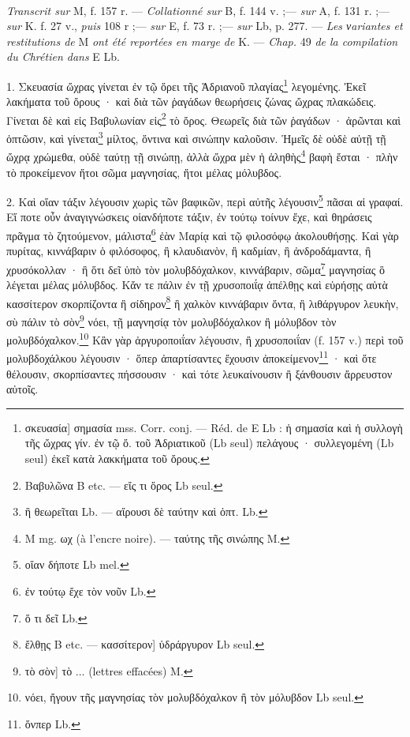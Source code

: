 \documentclass[landscape, a4paper, 11pt, oneside, polutonikogreek, french]{article}
\begin{document}
\paragraph{}
\emph{Transcrit sur} M, f. 157 r. --- \emph{Collationné sur} B, f. 144 v. ;--- \emph{sur} A, f. 131 r. ;--- \emph{sur} K. f. 27 v., \emph{puis} 108 r ;--- \emph{sur} E, f. 73 r. ;--- \emph{sur} Lb, p. 277. --- \emph{Les νariantes et restitutions de} M \emph{ont été reportées en marge de} K. --- \emph{Chap.} 49 \emph{de la compilation du Chrétien dans} E Lb.

\bigskip

1. Σκευασία ὤχρας γίνεται ἐν τῷ ὄρει τῆς Ἁδριανοῦ πλαγίας\footnote{σκευασία] σημασία mss. Corr. conj. --- Réd. de E Lb : ἡ σημασία καὶ ἡ συλλογὴ τῆς ὤχρας γίν. ἐν τῷ ὄ. τοῦ Ἀδριατικοῦ (Lb seul) πελάγους · συλλεγομένη (Lb seul) ἐκεῖ κατὰ λακκήματα τοῦ ὄρους.} λεγομένης. Ἐκεῖ λακήματα τοῦ ὄρους · καὶ διὰ τῶν ῥαγάδων θεωρήσεις ζώνας ὤχρας πλακώδεις. Γίνεται δὲ καὶ εἰς Βαβυλωνίαν εἰς\footnote{Bαβυλῶνα B etc. --- εἴς τι ὄρος Lb seul.} τὸ ὄρος. Θεωρεῖς διὰ τῶν ῥαγάδων · ἀρῶνται καὶ ὀπτῶσιν, καὶ γίνεται\footnote{ἣ θεωρεῖται Lb. --- αἴρουσι δὲ ταύτην καὶ ὀπτ. Lb.} μίλτος, ὅντινα καὶ σινώπην καλοῦσιν. Ἡμεῖς δὲ οὐδὲ αὐτῇ τῇ ὤχρᾳ χρώμεθα, οὐδὲ ταύτῃ τῇ σινώπῃ, ἀλλὰ ὤχρα μὲν ἡ ἀληθὴς\footnote{M mg. ωχ (à l'encre noire). --- ταύτης τῆς σινώπης M.} βαφὴ ἔσται · πλὴν τὸ προκείμενον ἤτοι σῶμα μαγνησίας, ἤτοι μέλας μόλυβδος.

2. Καὶ οἵαν τάξιν λέγουσιν χωρὶς τῶν βαφικῶν, περὶ αὐτῆς λέγουσιν\footnote{οἵαν δήποτε Lb mel.} πᾶσαι αἱ γραφαί. Εἴ ποτε οὖν ἀναγιγνώσκεις οἱανδήποτε τάξιν, ἐν τούτῳ τοίνυν ἔχε, καὶ θηράσεις πρᾶγμα τὸ ζητούμενον, μάλιστα\footnote{ἐν τούτῳ ἔχε τὸν νοῦν Lb.} ἐὰν Μαρίᾳ καὶ τῷ φιλοσόφῳ ἀκολουθήσῃς. Καὶ γὰρ πυρίτας, κιννάβαριν ὁ φιλόσοφος, ἢ κλαυδιανὸν, ἢ καδμίαν, ἢ ἀνδροδάμαντα, ἢ χρυσόκολλαν · ἢ ὅτι δεῖ ὑπὸ τὸν μολυβδόχαλκον, κιννάβαριν, σῶμα\footnote{ὅ τι δεῖ Lb.} μαγνησίας ὃ λέγεται μέλας μόλυβδος. Κἄν τε πάλιν ἐν τῇ χρυσοποιΐᾳ ἀπέλθῃς καὶ εὑρήσῃς αὐτὰ κασσίτερον σκορπίζοντα ἢ σίδηρον\footnote{ἔλθῃς B etc. --- κασσίτερον] ὑδράργυρον Lb seul.} ἢ χαλκὸν κιννάβαριν ὄντα, ἢ λιθάργυρον λευκὴν, σὺ πάλιν τὸ σὸν\footnote{τὸ σὸν] τὸ ... (lettres effacées) M.} νόει, τῇ μαγνησίᾳ τὸν μολυβδόχαλκον ἢ μόλυβδον τὸν μολυβδόχαλκον.\footnote{νόει, ἤγουν τῆς μαγνησίας τὸν μολυβδόχαλκον ἢ τὸν μόλυβδον Lb seul.} Κἂν γὰρ ἀργυροποιΐαν λέγουσιν, ἢ χρυσοποιΐαν (f. 157 v.) περὶ τοῦ μολυβδοχάλκου λέγουσιν · ὅπερ ἀπαρτίσαντες ἔχουσιν ἀποκείμενον\footnote{ὅνπερ Lb.} · καὶ ὅτε θέλουσιν, σκορπίσαντες πήσσουσιν · καὶ τότε λευκαίνουσιν ἢ ξάνθουσιν ἄρρευστον αὐτοῖς.
\end{document}
